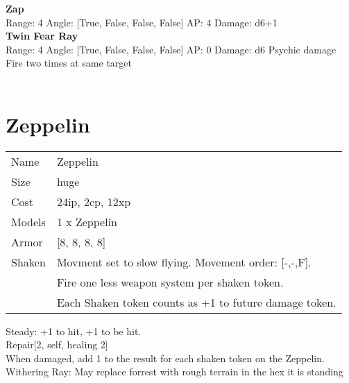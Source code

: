 {\bf Zap } \\



Range: 4  Angle: [True, False, False, False] AP: 4 Damage: d6+1 \\




{\bf Twin Fear Ray } \\



Range: 4  Angle: [True, False, False, False] AP: 0 Damage: d6 Psychic damage \\
Fire two times at same target\\ 




 
\ \\













\clearpage

\section{ Zeppelin }

\begin{tabular}{ll}
  Name & Zeppelin \\
  Size & huge\\
  Cost & 24ip, 2cp, 12xp\\
  Models & 1 x Zeppelin\\
  Armor & [8, 8, 8, 8]\\
  Shaken & Movment set to slow flying. Movement order: [-,-,F]. \ \\ &Fire one less weapon system per shaken token. \ \\ &Each Shaken token counts as +1 to future damage token.\\
\end{tabular}

\noindent Steady: +1 to hit, +1 to be hit.\\ 
Repair[2, self, healing 2]\\ 
 When damaged, add 1 to the result for each shaken token on the Zeppelin.\\ 
Withering Ray: May replace forrest with rough terrain in the hex it is standing\\ 


